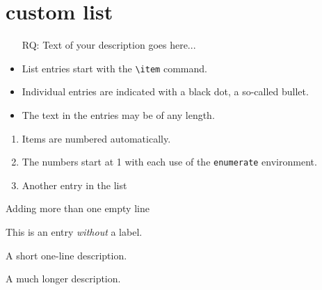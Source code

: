 \documentclass[16pt,a4paper]{article}
\begin{document}
\section{custom list}
\begin{itemize}
	\item[RQ:] Text of your description goes here...
	\item List entries start with the \verb|\item| command.
	\item Individual entries are indicated with a black dot, a so-called bullet.
	\item The text in the entries may be of any length.
\end{itemize}
\begin{enumerate}
	\item Items are numbered automatically.
	\item The numbers start at 1 with each use of the \texttt{enumerate} environment.
	\item Another entry in the list
\end{enumerate}

Adding more than one empty line\\[2\baselineskip]

\begin{description}
   \item This is an entry \textit{without} a label.
   \item[Something short] A short one-line description.
   \item[Something long] A much longer description. \blindtext[1]
\end{description}
\end{document}
